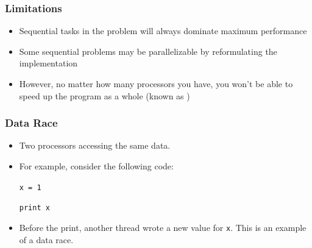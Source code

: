 \documentclass[aspectratio=43]{beamer}
\begin{document}
\begin{frame}
  \frametitle{Limitations}

\hspace*{.1\textwidth}\begin{minipage}{.85\textwidth}
  \begin{itemize}
    \item Sequential tasks in the problem will always dominate maximum
          performance\\[1em]
    \item Some sequential problems may be parallelizable by reformulating the
          implementation\\[1em]
    \item However, no matter how many processors you have, you won't be able to
          speed up the program as a whole (known as )
  \end{itemize}
\end{minipage}

\end{frame}

\begin{frame}[containsverbatim]
  \frametitle{Data Race}

  \begin{itemize}
    \item Two processors accessing the same data.
    \vfill
    \item For example, consider the following code:

          \verb+x = 1+

          \verb+print x+

    \vfill
    \item {} Before the print, another thread wrote a new value
          for \verb+x+. This is an example of a data race.
  \end{itemize}
\end{frame}
\end{document}
